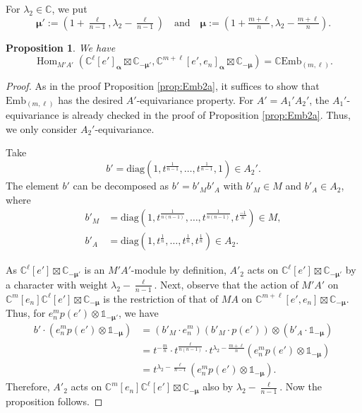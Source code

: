 \documentclass[reqno,11pt]{amsart}
\newtheorem{prop}[equation]{Proposition}
\theoremstyle{remark}
\theoremstyle{definition}
\numberwithin{equation}{section}
\newcommand{\C}{\mathbb{C}}
\newcommand{\Hom}{\operatorname{Hom}}
\newcommand{\diag}{\mathrm{diag}}
\newcommand{\balpha}{\bm{\alpha}}
\newcommand{\bmu}{\bm{\mu}}
\newcommand{\Emb}{\mathrm{Emb}}
\begin{document}
For $\lambda_2 \in \C$, we put
\begin{equation*}
\bmu':=(1+\tfrac{\ell}{n-1}, \lambda_2-\tfrac{\ell}{n-1})
\quad 
\text{and}
\quad
\bmu:=(1+\tfrac{m+\ell}{n},\lambda_2-\tfrac{m+\ell}{n}).
\end{equation*}


\begin{prop}\label{prop:Emb2}
We have
\begin{equation*}
\Hom_{M'A'}(\C^\ell[e']_{\balpha} \boxtimes \C_{-\bmu'},
\C^{m+\ell}[e',e_n]_{\balpha}\boxtimes \C_{-\bmu})
=\C \Emb_{(m,\ell)}.
\end{equation*}
\end{prop}

\begin{proof}
As in the proof Proposition \ref{prop:Emb2a}, it suffices to show
that $\Emb_{(m,\ell)}$ has the desired $A'$-equivariance property.
For $A' = A_1'A_2'$, the $A_1'$-equivariance is already checked in 
the proof of Proposition \ref{prop:Emb2a}. Thus, we only consider 
$A_2'$-equivariance.

Take
\begin{equation*}
b' = \diag(1, t^{\frac{1}{n-1}}, \ldots, t^{\frac{1}{n-1}}, 1) \in A_2'.
\end{equation*}
The element $b'$ can be decomposed as
$b' = b'_M b'_A$ with $b'_M \in M$ and $b'_A \in A_2$, where
\begin{align*}
b'_M 
&= \diag(1,t^{\frac{1}{n(n-1)}},\ldots, t^{\frac{1}{n(n-1)}}, t^{\frac{-1}{n}})
\in M,\\
b'_A
&= \diag(1,t^{\frac{1}{n}},\ldots, t^{\frac{1}{n}}, t^{\frac{1}{n}}) 
\in A_2.
\end{align*}

As $\C^\ell[e']\boxtimes \C_{-\bmu'}$ is an $M'A'$-module by definition,
$A'_2$ acts on $\C^\ell[e']\boxtimes \C_{-\bmu'}$ by a character 
with weight $\lambda_2-\tfrac{\ell}{n-1}$.
Next, observe that the action of $M'A'$ 
on $\C^m[e_n]\C^\ell[e']\boxtimes \C_{-\bmu}$
is the restriction of that of $MA$ on $\C^{m+\ell}[e',e_n]\boxtimes \C_{-\bmu}$.
Thus, for $e_n^mp(e')\otimes \mathbb{1}_{-\bmu'}$, we have 
\begin{align*}
b'\cdot (e_n^mp(e')\otimes \mathbb{1}_{-\bmu})
&=(b'_M \cdot e_n^m)(b'_M \cdot p(e'))\otimes (b'_A \cdot \mathbb{1}_{-\bmu})\\
&=t^{-\tfrac{m}{n}}\cdot 
t^{\tfrac{\ell}{n(n-1)}} \cdot t^{\lambda_2-\tfrac{m+\ell}{n}}(e_n^mp(e')\otimes \mathbb{1}_{-\bmu})\\
&=t^{\lambda_2-\tfrac{\ell}{n-1}}(e_n^mp(e')\otimes \mathbb{1}_{-\bmu}).
\end{align*}
Therefore, $A'_2$ acts on $\C^m[e_n]\C^\ell[e']\boxtimes \C_{-\bmu}$ 
also by $\lambda_2-\tfrac{\ell}{n-1}$. 
Now the proposition follows.
\end{proof}
\end{document}
